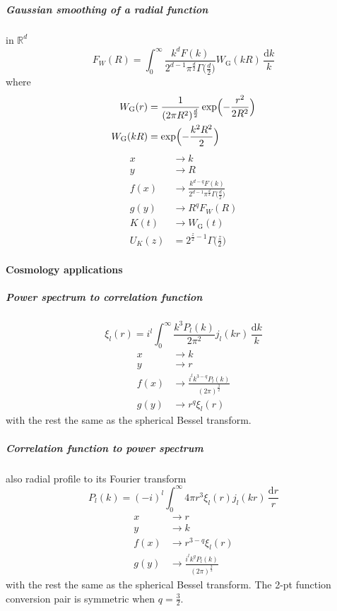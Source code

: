 \documentclass{article}
\renewcommand{\d}{\mathrm{d}}
\newcommand{\Mellin}{U}
\newcommand{\Gauss}{\textrm{G}}
\begin{document}
\subparagraph{Gaussian smoothing of a radial function}
in $\mathbb{R}^d$
\begin{equation}
    F_W(R) = \int_0^\infty \frac{k^d F(k)}{2^{d-1}\pi^\frac{d}2\Gamma\bigl(\frac{d}2\bigr)}
                    W_\Gauss(kR) \,\frac{\d k}k
\end{equation}
where
\begin{align}
    W_\Gauss(r) &= \frac1{(2\pi R^2)^\frac{d}2} \exp\Bigl(-\frac{r^2}{2R^2}\Bigr)  \\
    W_\Gauss(kR) &= \exp\Bigl(-\frac{k^2R^2}2\Bigr)
\end{align}
\begin{align}
    x &\to k  \\
    y &\to R  \\
    f(x) &\to \frac{k^{d-q}F(k)}{2^{d-1}\pi^\frac{d}2\Gamma\bigl(\frac{d}2\bigr)}  \\
    g(y) &\to R^q F_W(R)  \\
    K(t) &\to W_\Gauss(t)  \\
    \Mellin_K(z) &= 2^{\frac{z}2-1} \Gamma\bigl(\tfrac{z}2\bigr)
\end{align}


\paragraph{Cosmology applications}


\subparagraph{Power spectrum to correlation function}
\begin{equation}
    \xi_l(r) = i^l \int_0^\infty \frac{k^3P_l(k)}{2\pi^2} j_l(kr) \,\frac{\d k}k
\end{equation}
\begin{align}
    x &\to k  \\
    y &\to r  \\
    f(x) &\to \frac{i^l k^{3-q} P_l(k)}{(2\pi)^\frac32}  \\
    g(y) &\to r^q \xi_l(r)
\end{align}
with the rest the same as the spherical Bessel transform.


\subparagraph{Correlation function to power spectrum}
also radial profile to its Fourier transform
\begin{equation}
    P_l(k) = (-i)^l \int_0^\infty 4\pi r^3\xi_l(r) j_l(kr) \,\frac{\d r}r
\end{equation}
\begin{align}
    x &\to r  \\
    y &\to k  \\
    f(x) &\to r^{3-q} \xi_l(r)  \\
    g(y) &\to \frac{i^l k^q P_l(k)}{(2\pi)^\frac32}
\end{align}
with the rest the same as the spherical Bessel transform.
The 2-pt function conversion pair is symmetric when $q=\frac32$.
\end{document}

